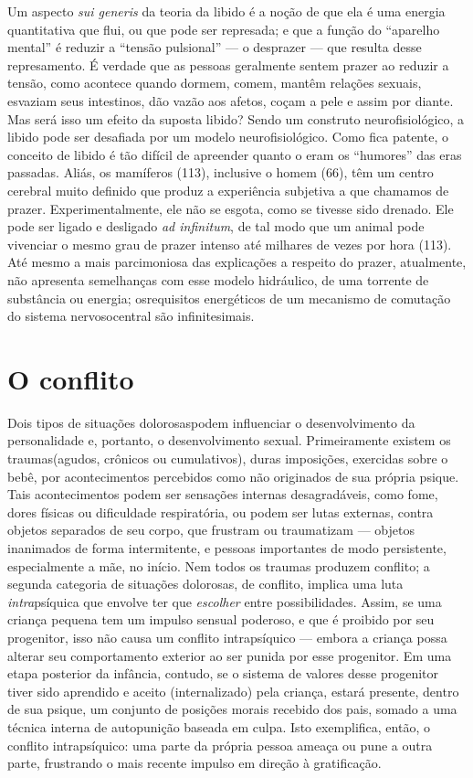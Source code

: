  Um aspecto \textit{sui generis} da teoria da libido é a noção de que
ela é uma energia quantitativa que flui, ou que pode ser represada; e
que a função do ``aparelho mental'' é reduzir
a ``tensão pulsional'' --- o desprazer --- que
resulta desse represamento. É verdade que as pessoas geralmente sentem
prazer ao reduzir a tensão, como acontece quando dormem, comem, mantêm
relações sexuais, esvaziam seus intestinos, dão vazão aos afetos, coçam
a pele e assim por diante. Mas será isso um efeito da suposta libido?
Sendo um construto neurofisiológico, a libido pode ser desafiada por um
modelo neurofisiológico. Como fica patente, o conceito de libido é tão
difícil de apreender quanto o eram os ``humores'' das eras passadas. Aliás, os
mamíferos (113), inclusive o homem (66), têm um centro cerebral muito
definido que produz a experiência subjetiva a que chamamos de prazer.\idxcerebpraz{}
Experimentalmente, ele não se esgota, como se tivesse sido drenado. Ele
pode ser ligado e desligado \textit{ad infinitum}, de tal modo que um
animal pode vivenciar o mesmo grau de prazer intenso até milhares de
vezes por hora (113). Até mesmo a mais parcimoniosa das explicações a
respeito do prazer, atualmente, não apresenta semelhanças com esse
modelo hidráulico, de uma torrente de substância ou energia; os\idxlibid[|)]
requisitos energéticos de um mecanismo de comutação do sistema nervoso\idxsociadese[|)]
central são infinitesimais.

\section{O conflito}

 Dois tipos de situações dolorosas\idxconf[|(] podem influenciar o
desenvolvimento da personalidade e, portanto, o desenvolvimento sexual.
Primeiramente existem os traumas\idxtrauma[|(] (agudos, crônicos ou cumulativos),
duras imposições, exercidas sobre o bebê, por acontecimentos percebidos
como não originados de sua própria psique. Tais acontecimentos podem
ser sensações internas desagradáveis, como fome, dores físicas ou
dificuldade respiratória, ou podem ser lutas externas, contra objetos
separados de seu corpo, que frustram ou traumatizam --- objetos
inanimados de forma intermitente, e pessoas importantes de modo
persistente, especialmente a mãe, no início. Nem todos os traumas
produzem conflito; a segunda categoria de situações dolorosas, de
conflito, implica uma luta \textit{intra}psíquica que envolve ter que
\textit{escolher} entre possibilidades. Assim, se uma criança pequena
tem um impulso sensual poderoso, e que é proibido por seu progenitor,
isso não causa um conflito intrapsíquico\idxconfintr{} --- embora a criança possa
alterar seu comportamento exterior ao ser punida por esse progenitor.
Em uma etapa posterior da infância, contudo, se o sistema de valores
desse progenitor tiver sido aprendido e aceito (internalizado) pela
criança, estará presente, dentro de sua psique, um conjunto de
posições morais recebido dos pais, somado a uma técnica interna de
autopunição baseada em culpa.\idxculpa{} Isto exemplifica, então, o conflito
intrapsíquico: uma parte da própria pessoa ameaça ou pune a outra
parte, frustrando o mais recente impulso em direção à gratificação.


